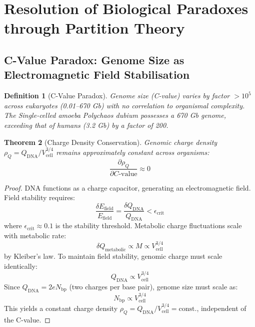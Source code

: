 \documentclass[11pt,a4paper]{article}
\newtheorem{theorem}{Theorem}[section]
\newtheorem{definition}[theorem]{Definition}
\theoremstyle{remark}
\begin{document}
\section{Resolution of Biological Paradoxes through Partition Theory}

\subsection{C-Value Paradox: Genome Size as Electromagnetic Field Stabilisation}

\begin{definition}[C-Value Paradox]
\label{def:c_value_paradox}
Genome size (C-value) varies by factor $>10^5$ across eukaryotes (0.01--670 Gb) with no correlation to organismal complexity. The Single-celled amoeba \textit{Polychaos dubium} possesses a 670 Gb genome, exceeding that of humans (3.2 Gb) by a factor of 200.
\end{definition}

\begin{theorem}[Charge Density Conservation]
\label{thm:charge_density_conservation}
Genomic charge density $\rho_Q = Q_{\text{DNA}}/V_{\text{cell}}^{3/4}$ remains approximately constant across organisms:
\begin{equation}
\frac{\partial \rho_Q}{\partial C\text{-value}} \approx 0
\end{equation}
\end{theorem}

\begin{proof}
DNA functions as a charge capacitor, generating an electromagnetic field. Field stability requires:
\begin{equation}
\frac{\delta E_{\text{field}}}{E_{\text{field}}} = \frac{\delta Q_{\text{DNA}}}{Q_{\text{DNA}}} < \epsilon_{\text{crit}}
\end{equation}
where $\epsilon_{\text{crit}} \approx 0.1$ is the stability threshold. Metabolic charge fluctuations scale with metabolic rate:
\begin{equation}
\delta Q_{\text{metabolic}} \propto M \propto V_{\text{cell}}^{3/4}
\end{equation}
by Kleiber's law. To maintain field stability, genomic charge must scale identically:
\begin{equation}
Q_{\text{DNA}} \propto V_{\text{cell}}^{3/4}
\end{equation}
Since $Q_{\text{DNA}} = 2eN_{\text{bp}}$ (two charges per base pair), genome size must scale as:
\begin{equation}
N_{\text{bp}} \propto V_{\text{cell}}^{3/4}
\end{equation}
This yields a constant charge density $\rho_Q = Q_{\text{DNA}}/V_{\text{cell}}^{3/4} = \text{const.}$, independent of the C-value.
\end{proof}
\end{document}
